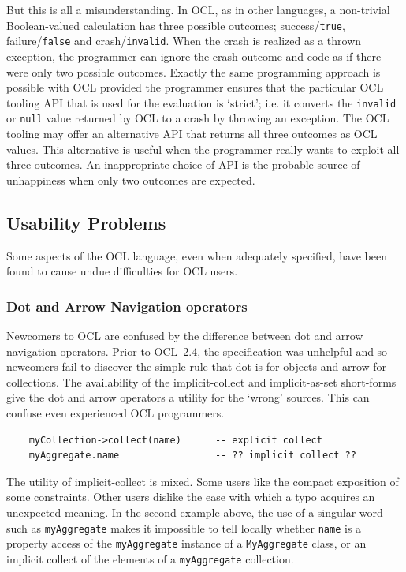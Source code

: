 \documentclass{jot}
\begin{document}
But this is all a misunderstanding. In OCL, as in other languages, a non-trivial Boolean-valued calculation has three possible outcomes; success/\verb$true$, failure/\verb$false$ and crash/\verb$invalid$. When the crash is realized as a thrown exception, the programmer can ignore the crash outcome and code as if there were only two possible outcomes. Exactly the same programming approach is possible with OCL provided the programmer ensures that the particular OCL tooling API
that is used for the evaluation is `strict'; i.e. it converts the \verb$invalid$ or \verb$null$ value returned by OCL to a crash by throwing an exception. The OCL tooling may offer an alternative API %
that returns all three outcomes as OCL values. This alternative is useful when the programmer really wants to exploit all three outcomes. An inappropriate choice of API is the probable source of unhappiness when only two outcomes are expected.

\subsection{Usability Problems}

Some aspects of the OCL language, even when adequately specified, have been found to cause undue difficulties for OCL users.

\subsubsection{Dot and Arrow Navigation operators}

Newcomers to OCL are confused by the difference between dot and arrow navigation operators. Prior to OCL~2.4, the specification was unhelpful and so newcomers fail to discover the simple rule that dot is for objects and arrow for collections. The availability of the implicit-collect and implicit-as-set short-forms give the dot and arrow operators a utility for the `wrong' sources. This can confuse even experienced OCL programmers.

\begin{verbatim}
    myCollection->collect(name)      -- explicit collect
    myAggregate.name                 -- ?? implicit collect ??
\end{verbatim}

The utility of implicit-collect is mixed. Some users like the compact exposition of some constraints. Other users dislike the ease with which a typo acquires an unexpected meaning. In the second example above, the use of a singular word such as \verb$myAggregate$ makes it impossible to tell locally whether \verb$name$ is a property access of the \verb$myAggregate$ instance of a \verb$MyAggregate$ class, or an implicit collect of the elements of a \verb$myAggregate$ collection.
\end{document}

